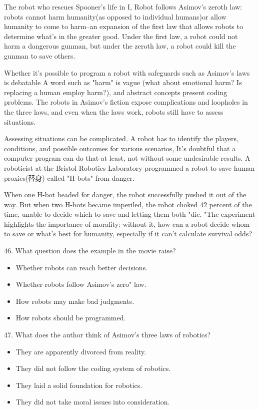 \documentclass[UTF8,11pt]{ctexart}
\begin{document}
The robot who rescues Spooner’s life in I, Robot follows Asimov's zeroth law: robots cannot harm humanity(as opposed to individual humans)or allow humanity to come to harm--an expansion of the first law that allows robots to determine what's in the greater good. Under the first law, a robot could not harm a dangerous gunman, but under the zeroth law, a robot could kill the gunman to save others.


Whether it's possible to program a robot with safeguards such as Asimov's laws is debatable A word such as "harm" is vague (what about emotional harm? Is replacing a human employ harm?), and abstract concepts present coding problems. The robots in Asimov's fiction expose complications and loopholes in the three laws, and even when the laws work, robots still have to assess situations.


Assessing situations can be complicated. A robot has to identify the players, conditions, and possible outcomes for various scenarios, It’s doubtful that a computer program can do that-at least, not without some undesirable results. A roboticist at the Bristol Robotics Laboratory programmed a robot to save human proxies(替身) called "H-bots" from danger.


When one H-bot headed for danger, the robot successfully pushed it out of the way. But when two H-bots became imperiled, the robot choked 42 percent of the time, unable to decide which to save and letting them both "die. "The experiment highlights the importance of morality: without it, how can a robot decide whom to save or what's best for humanity, especially if it can't calculate survival odds?


46. What question does the example in the movie raise?


\begin{itemize}[leftmargin=2em,itemsep=.2em,topsep=.4em]\item[A.] Whether robots can reach better decisions.
\item[B.] Whether robots follow Asimov's zero" law.
\item[C.] How robots may make bad judgments.
\item[D.] How robots should be programmed.
\end{itemize}

47. What does the author think of Asimov’s three laws of robotics?


\begin{itemize}[leftmargin=2em,itemsep=.2em,topsep=.4em]\item[A.] They are apparently divorced from reality.
\item[B.] They did not follow the coding system of robotics.
\item[C.] They laid a solid foundation for robotics.
\item[D.] They did not take moral issues into consideration.
\end{itemize}
\end{document}
